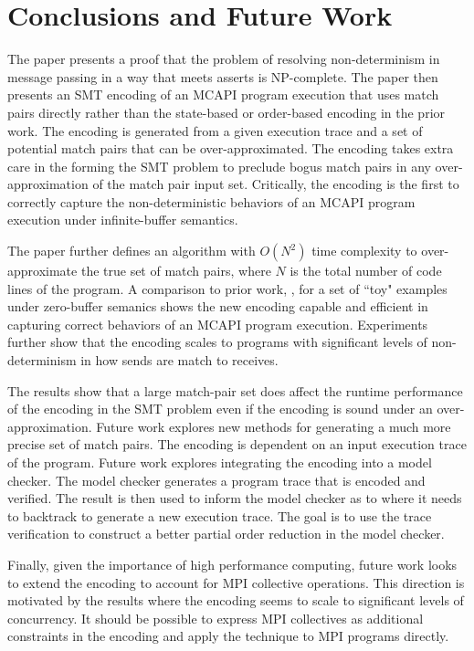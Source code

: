 \section{Conclusions and Future Work}
The paper presents a proof that the problem of resolving
non-determinism in message passing in a way that meets asserts is
NP-complete. The paper then presents an SMT encoding of an MCAPI
program execution that uses match pairs directly rather than the
state-based or order-based encoding in the prior work. The encoding is
generated from a given execution trace and a set of potential match
pairs that can be over-approximated. The encoding takes extra care in
the forming the SMT problem to preclude bogus match pairs in any
over-approximation of the match pair input set. Critically, the
encoding is the first to correctly capture the non-deterministic
behaviors of an MCAPI program execution under infinite-buffer
semantics.

The paper further defines an algorithm with $O(N^2)$ time complexity
to over-approximate the true set of match pairs, where $N$ is the
total number of code lines of the program. A comparison to prior work,
\cite{elwakil:padtad10}, for a set of ``toy" examples under
zero-buffer semanics shows the new encoding capable and efficient in
capturing correct behaviors of an MCAPI program execution. Experiments
further show that the encoding scales to programs with significant levels of
non-determinism in how sends are match to receives.

The results show that a large match-pair set does affect the runtime
performance of the encoding in the SMT problem even if the encoding is
sound under an over-approximation. Future work explores new methods
for generating a much more precise set of match pairs. The encoding is
dependent on an input execution trace of the program. Future work
explores integrating the encoding into a model checker. The model
checker generates a program trace that is encoded and verified. The
result is then used to inform the model checker as to where it needs
to backtrack to generate a new execution trace. The goal is to use the
trace verification to construct a better partial order reduction in
the model checker.

Finally, given the importance of high performance computing, future
work looks to extend the encoding to account for MPI collective
operations. This direction is motivated by the results where the
encoding seems to scale to significant levels of concurrency. It
should be possible to express MPI collectives as additional
constraints in the encoding and apply the technique to MPI programs
directly.
